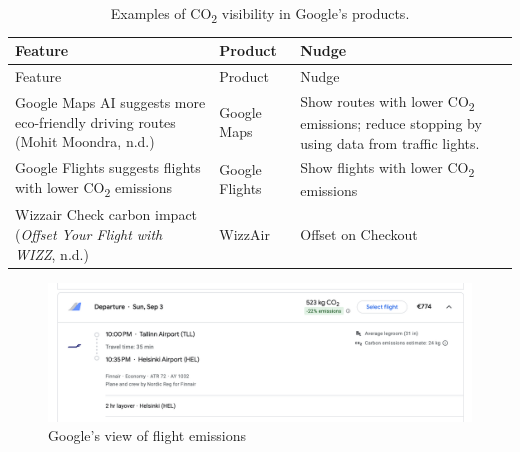 \documentclass[
  12pt,
  letterpaper,
  DIV=11,
  numbers=noendperiod]{scrartcl}
\begin{document}
\begin{longtable}[]{@{}
  >{\raggedright\arraybackslash}p{}
  >{\raggedright\arraybackslash}p{}
  >{\raggedright\arraybackslash}p{}@{}}
\caption[Examples of CO~2~ Visibility in Google's Products]{Examples of
CO\textsubscript{2} visibility in Google's products.}\tabularnewline
\toprule\noalign{}
\begin{minipage}[b]{\linewidth}\raggedright
Feature
\end{minipage} & \begin{minipage}[b]{\linewidth}\raggedright
Product
\end{minipage} & \begin{minipage}[b]{\linewidth}\raggedright
Nudge
\end{minipage} \\
\midrule\noalign{}
\endfirsthead
\toprule\noalign{}
\begin{minipage}[b]{\linewidth}\raggedright
Feature
\end{minipage} & \begin{minipage}[b]{\linewidth}\raggedright
Product
\end{minipage} & \begin{minipage}[b]{\linewidth}\raggedright
Nudge
\end{minipage} \\
\midrule\noalign{}
\endhead
\bottomrule\noalign{}
\endlastfoot
Google Maps AI suggests more eco-friendly driving routes (Mohit Moondra,
n.d.) & Google Maps & Show routes with lower CO\textsubscript{2}
emissions; reduce stopping by using data from traffic lights. \\
Google Flights suggests flights with lower CO\textsubscript{2} emissions
& Google Flights & Show flights with lower CO\textsubscript{2}
emissions \\
Wizzair Check carbon impact (\emph{Offset Your Flight with {WIZZ}},
n.d.) & WizzAir & Offset on Checkout \\
\end{longtable}

\let\pandoctableshortcapt\relax

\begin{figure}[H]

{\centering \includegraphics[width=1\linewidth,height=\textheight,keepaspectratio]{./images/design/flight-emissions.png}

}

\caption{Google's view of flight emissions}

\end{figure}%
\end{document}
